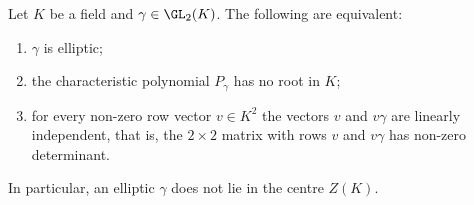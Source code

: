 Let $K$ be a field and $\gamma\in\GL_2(K)$. The following are equivalent:
\begin{enumerate}
  \item[(a)] $\gamma$ is elliptic;
  \item[(b)] the characteristic polynomial $P_\gamma$ has no root in $K$;
  \item[(c)] for every non-zero row vector $v\in K^2$ the vectors $v$ and $v\gamma$ are linearly independent, that is, the
  $2\times2$ matrix with rows $v$ and $v\gamma$ has non-zero determinant.
\end{enumerate}
In particular, an elliptic $\gamma$ does not lie in the centre $Z(K)$.
